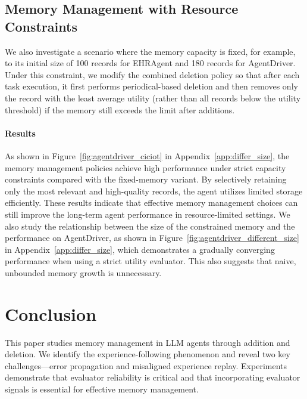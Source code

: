 \documentclass[11pt]{article}
\theoremstyle{plain}
\theoremstyle{definition}
\begin{document}
{%
\subsection{Memory Management with Resource Constraints}
\label{sec:limited_resources}

We also investigate a scenario where the memory capacity is fixed, for example, to its initial size of 100 records for EHRAgent and 180 records for AgentDriver. 
Under this constraint, we modify the combined deletion policy so that after each task execution, it first performs periodical-based deletion and then removes only the record with the least average utility (rather than all records below the utility threshold) if the memory still exceeds the limit after additions.

\paragraph{Results} As shown in Figure~\ref{fig:agentdriver_ciciot} in Appendix~\ref{app:differ_size}, the memory management policies achieve high performance under strict capacity constraints compared with the fixed-memory variant.
By selectively retaining only the most relevant and high-quality records, the agent utilizes limited storage efficiently. 
These results indicate that effective memory management choices can still improve the long-term agent performance in resource-limited settings. 
We also study the relationship between the size of the constrained memory and the performance on AgentDriver, as shown in Figure~\ref{fig:agentdriver_different_size} in Appendix~\ref{app:differ_size}, which demonstrates a gradually converging performance when using a strict utility evaluator.       
This also suggests that naive, unbounded memory growth is unnecessary.


\section{Conclusion}
This paper studies memory management in LLM agents through addition and deletion.
We identify the experience-following phenomenon and reveal two key challenges—error propagation and misaligned experience replay.
Experiments demonstrate that evaluator reliability is critical and that incorporating evaluator signals is essential for effective memory management.

}
\end{document}
